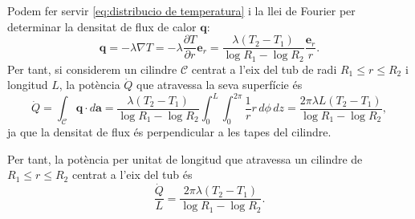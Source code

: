 \documentclass[12pt]{article}
\renewcommand{\vec}[1]{\mathbf{#1}}
\begin{document}
Podem fer servir \cref{eq:distribucio de temperatura} i la llei de Fourier per determinar la densitat de flux de calor \( \vec{q} \):
\begin{equation*}
	\vec{q} = -\lambda \nabla T = -\lambda \frac{\partial T}{\partial r} \vec{e}_r =  \frac{\lambda \left(T_2 - T_1\right)}{\log{R_1} - \log{R_2}} \frac{\vec{e}_r}{r} .
\end{equation*}
Per tant, si considerem un cilindre \( \mathcal{C} \) centrat a l'eix del tub de radi \( R_1 \leq r \leq R_2 \) i longitud \( L \), la potència \( \dot{Q} \) que atravessa la seva superfície és
\begin{equation*}
\dot{Q} = \int_{\mathcal{C}} \vec{q} \cdot d\vec{a} = \frac{\lambda \left(T_2 - T_1\right)}{\log{R_1} - \log{R_2}} \int_0^L \int_0^{2\pi} \frac{1}{r} r \, d\phi \, dz = \frac{2\pi \lambda L \left(T_2 - T_1\right)}{\log{R_1} - \log{R_2}} ,
\end{equation*}
ja que la densitat de flux és perpendicular a les tapes del cilindre. 

Per tant, la potència per unitat de longitud que atravessa un cilindre de \( R_1 \leq r \leq R_2 \) centrat a l'eix del tub és 
\begin{equation*}
	\frac{\dot{Q}}{L} = \frac{2\pi\lambda \left(T_2 - T_1\right)}{\log{R_1} - \log{R_2}}.
\end{equation*}
\end{document}
